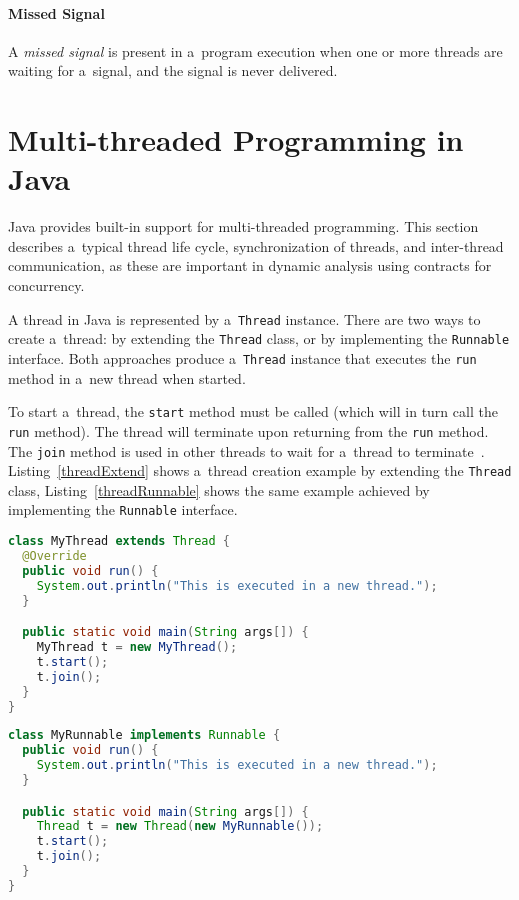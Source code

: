 \paragraph{Missed Signal}
A \emph{missed signal} is present in a~program execution when one or more
threads are waiting for a~signal, and the signal is never delivered.

\section{Multi-threaded Programming in Java}

Java provides built-in support for multi-threaded programming. This section
describes a~typical thread life cycle, synchronization of threads, and
inter-thread communication, as these are important in dynamic analysis using
contracts for concurrency.

A thread in Java is represented by a~\texttt{Thread} instance. There are two
ways to create a~thread: by extending the \texttt{Thread} class, or by
implementing the \texttt{Runnable} interface. Both approaches produce
a~\texttt{Thread} instance that executes the \texttt{run} method in a~new thread
when started.

To start a~thread, the \texttt{start} method must be called (which will in
turn call the \texttt{run} method). The thread will terminate upon returning
from the \texttt{run} method. The \texttt{join} method is used in other
threads to wait for a~thread to terminate~\cite{javaTheCompleteReference}.
Listing~\ref{threadExtend} shows a~thread creation example by extending the
\texttt{Thread} class, Listing~\ref{threadRunnable} shows the same example
achieved by implementing the \texttt{Runnable} interface.

\begin{lstlisting}[language=java, caption={A simple program that creates
a~thread by extending the \texttt{Thread} class.}, float=hb, label=threadExtend]
class MyThread extends Thread {
  @Override
  public void run() {
    System.out.println("This is executed in a new thread.");
  }

  public static void main(String args[]) {
    MyThread t = new MyThread();
    t.start();
    t.join();
  }
}
\end{lstlisting}

\begin{lstlisting}[language=java, label=threadRunnable, float=ht, caption={A
simple program that creates a~thread by implementing the \texttt{Runnable}
interface.}]
class MyRunnable implements Runnable {
  public void run() {
    System.out.println("This is executed in a new thread.");
  }

  public static void main(String args[]) {
    Thread t = new Thread(new MyRunnable());
    t.start();
    t.join();
  }
}
\end{lstlisting}

